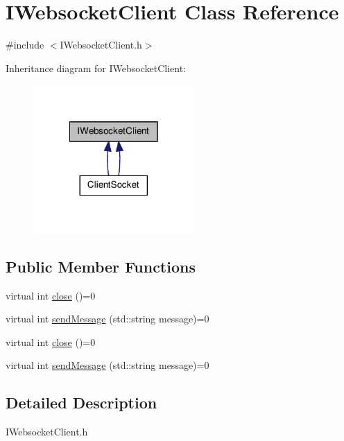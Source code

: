 \hypertarget{class_i_websocket_client}{\section{I\-Websocket\-Client Class Reference}
\label{class_i_websocket_client}
}


{\ttfamily \#include $<$I\-Websocket\-Client.\-h$>$}



Inheritance diagram for I\-Websocket\-Client\-:
\nopagebreak
\begin{figure}[H]
\begin{center}
\leavevmode
\includegraphics[width=174pt]{class_i_websocket_client__inherit__graph}
\end{center}
\end{figure}
\subsection*{Public Member Functions}
\begin{DoxyCompactItemize}
\item 
virtual int \hyperlink{class_i_websocket_client_ad20fddcd08c7880146fcd4ac20bb7b83}{close} ()=0
\item 
virtual int \hyperlink{class_i_websocket_client_ac2178027869dc142fe924858d59fc9c1}{send\-Message} (std\-::string message)=0
\item 
virtual int \hyperlink{class_i_websocket_client_ad20fddcd08c7880146fcd4ac20bb7b83}{close} ()=0
\item 
virtual int \hyperlink{class_i_websocket_client_ac2178027869dc142fe924858d59fc9c1}{send\-Message} (std\-::string message)=0
\end{DoxyCompactItemize}


\subsection{Detailed Description}
I\-Websocket\-Client.\-h

